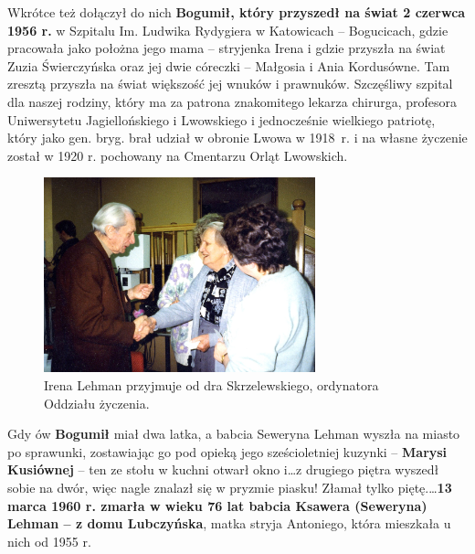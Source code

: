 Wkrótce też dołączył do nich \textbf{Bogumił, który przyszedł na świat 2 czerwca 1956 r.} w Szpitalu Im. Ludwika Rydygiera w Katowicach -- Bogucicach, gdzie pracowała jako położna jego mama -- stryjenka Irena i gdzie przyszła na świat Zuzia Świerczyńska oraz jej dwie córeczki -- Małgosia i Ania Kordusówne. Tam zresztą przyszła na świat większość jej wnuków i prawnuków. Szczęśliwy szpital dla naszej rodziny, który ma za patrona znakomitego lekarza chirurga, profesora Uniwersytetu Jagiellońskiego i Lwowskiego i jednocześnie wielkiego patriotę, który jako gen. bryg. brał udział w obronie Lwowa w 1918~r. i na własne życzenie został w 1920 r. pochowany na Cmentarzu Orląt Lwowskich.

\begin{figure}[!h]
\begin{center}
\includegraphics[width=0.7\textwidth]{photo/irena_lehman_1.jpg}
\caption{Irena Lehman przyjmuje od dra Skrzelewskiego, ordynatora Oddziału życzenia.}
\label{rys:irena_lehman_1}
\end{center}
\end{figure}

Gdy ów \textbf{Bogumił} miał dwa latka, a babcia Seweryna Lehman wyszła na miasto po sprawunki, zostawiając go pod opieką jego sześcioletniej kuzynki -- \textbf{Marysi Kusiównej} -- ten ze stołu w kuchni otwarł okno i\ldots z drugiego piętra wyszedł sobie na dwór, więc nagle znalazł się w pryzmie piasku! Złamał tylko piętę.\ldots \textbf{13 marca 1960 r. zmarła w wieku 76 lat babcia Ksawera (Seweryna) Lehman -- z domu Lubczyńska}, matka stryja Antoniego, która mieszkała u nich od 1955 r.

